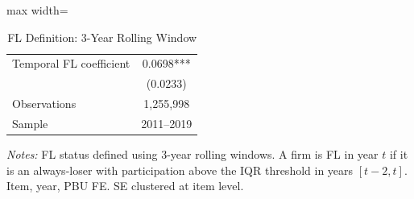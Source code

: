 \begin{table}[htbp]
\centering
\caption{FL Definition: 3-Year Rolling Window}
\label{tab:fl_temporal}
\begin{adjustbox}{max width=\textwidth}
\begin{threeparttable}
\small
\begin{tabular}{lc}
\toprule
\midrule
Temporal FL coefficient & 0.0698*** \\
 & (0.0233) \\
Observations & 1,255,998 \\
Sample & 2011--2019 \\
\bottomrule
\end{tabular}
\begin{tablenotes}
\small
\item \textit{Notes:} FL status defined using 3-year rolling windows.
A firm is FL in year $t$ if it is an always-loser with participation above
the IQR threshold in years $[t-2, t]$. Item, year, PBU FE.
SE clustered at item level.
\end{tablenotes}
\end{threeparttable}
\end{adjustbox}
\end{table}
